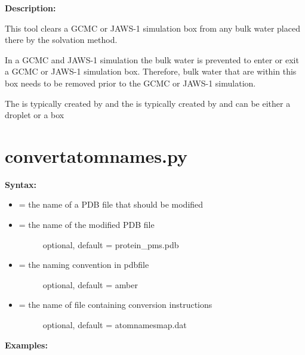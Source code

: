 \documentclass[letterpaper,10pt,english]{sphinxmanual}
\begin{document}
\textbf{Description:}

This tool clears a GCMC or JAWS-1 simulation box from any bulk water placed there by the solvation method.

In a GCMC and JAWS-1 simulation the bulk water is prevented to enter or exit a GCMC or JAWS-1 simulation box. Therefore, bulk water that are within this box needs to be removed prior to the GCMC or JAWS-1 simulation.

The  is typically created by  and the  is typically created by  and can be either a droplet or a box


\section{convertatomnames.py}
\label{tools:convertatomnames-py}
\textbf{Syntax:}

\begin{itemize}
\item {} 
 = the name of a PDB file that should be modified

\item {} \begin{description}
\item[{ = the name of the modified PDB file}] \leavevmode
optional, default = protein\_pms.pdb

\end{description}

\item {} \begin{description}
\item[{ = the naming convention in pdbfile}] \leavevmode
optional, default = amber

\end{description}

\item {} \begin{description}
\item[{ = the name of file containing conversion instructions}] \leavevmode
optional, default = atomnamesmap.dat

\end{description}

\end{itemize}

\textbf{Examples:}
\end{document}
